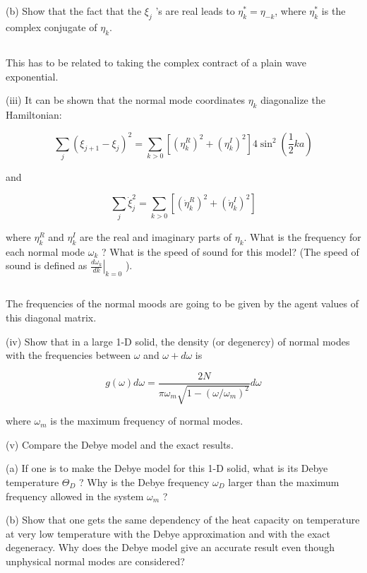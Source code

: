 \documentclass[12pt]{article}
\begin{document}
(b) Show that the fact that the $\xi_{j}$ 's are real leads to $\eta_{k}^{*}=\eta_{-k}$, where $\eta_{k}^{*}$ is the complex conjugate of $\eta_{k}$.
\subsection{}
This has to be related to taking the complex contract of a plain wave exponential.

(iii) It can be shown that the normal mode coordinates $\eta_{k}$ diagonalize the Hamiltonian:


\begin{equation*}
\sum_{j}\left(\xi_{j+1}-\xi_{j}\right)^{2}=\sum_{k>0}\left[\left(\eta_{k}^{R}\right)^{2}+\left(\eta_{k}^{I}\right)^{2}\right] 4 \sin ^{2}\left(\frac{1}{2} k a\right) \tag{8}
\end{equation*}


and


\begin{equation*}
\sum_{j} \dot{\xi}_{j}^{2}=\sum_{k>0}\left[\left(\dot{\eta}_{k}^{R}\right)^{2}+\left(\dot{\eta}_{k}^{I}\right)^{2}\right] \tag{9}
\end{equation*}


where $\eta_{k}^{R}$ and $\eta_{k}^{I}$ are the real and imaginary parts of $\eta_{k}$. What is the frequency for each normal mode $\omega_{k}$ ? What is the speed of sound for this model? (The speed of sound is defined as $\left.\frac{d \omega_{k}}{d k}\right|_{k=0}$ ).
\subsection{}
The frequencies of the normal moods are going to be given by the agent values of this diagonal matrix.

(iv) Show that in a large 1-D solid, the density (or degenercy) of normal modes with the frequencies between $\omega$ and $\omega+d \omega$ is


\begin{equation*}
g(\omega) d \omega=\frac{2 N}{\pi \omega_{m} \sqrt{1-\left(\omega / \omega_{m}\right)^{2}}} d \omega \tag{10}
\end{equation*}


where $\omega_{m}$ is the maximum frequency of normal modes.

(v) Compare the Debye model and the exact results.

(a) If one is to make the Debye model for this 1-D solid, what is its Debye temperature $\Theta_{D}$ ? Why is the Debye frequency $\omega_{D}$ larger than the maximum frequency allowed in the system $\omega_{m}$ ?

(b) Show that one gets the same dependency of the heat capacity on temperature at very low temperature with the Debye approximation and with the exact degeneracy. Why does the Debye model give an accurate result even though unphysical normal modes are considered?
\end{document}
